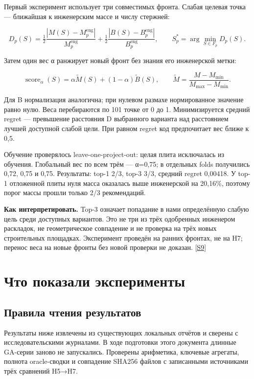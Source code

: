 \documentclass[11pt,a4paper]{article}
\begin{document}
Первый эксперимент использует три совместимых фронта. Слабая целевая точка — ближайшая к инженерским массе и числу стержней:


\[
D_p(S)=\tfrac12\frac{|M(S)-M_p^{\mathrm{eng}}|}{M_p^{\mathrm{eng}}}
+\tfrac12\frac{|B(S)-B_p^{\mathrm{eng}}|}{B_p^{\mathrm{eng}}},
\qquad S_p^*=\arg\min_{S\in F_p}D_p(S).
\]

Затем один вес α ранжирует новый фронт без знания его инженерской метки:


\[
\operatorname{score}_\alpha(S)=\alpha\widetilde M(S)+(1-\alpha)\widetilde B(S),
\qquad \widetilde M=\frac{M-M_{\min}}{M_{\max}-M_{\min}}.
\]

Для B нормализация аналогична; при нулевом размахе нормированное значение равно нулю. Веса перебираются по 101 точке от 0 до 1. Минимизируется средний regret — превышение расстояния D выбранного варианта над расстоянием лучшей доступной слабой цели. При равном regret код предпочитает вес ближе к 0,5.


Обучение проверялось leave-one-project-out: целая плита исключалась из обучения. Глобальный вес по всем трём — α=0,75; в отдельных folds получились 0,72, 0,75 и 0,75. Результаты: top-1 2/3, top-3 3/3, средний regret 0,00418. У top-1 отложенной плиты нуля масса оказалась выше инженерской на 20,16\%, поэтому порог массы прошли только 2/3 рекомендаций.


\textbf{Как интерпретировать.} Top-3 означает попадание в нами определённую слабую цель среди доступных вариантов. Это не три из трёх одобренных инженером раскладок, не геометрическое совпадение и не проверка на трёх новых строительных площадках. Эксперимент проведён на ранних фронтах, не на H7; перенос веса на новые фронты без новой проверки не доказан. {\color{Teal}\small[\hyperlink{S9}{S9}]}


\section{Что показали эксперименты}

\subsection{Правила чтения результатов}

Результаты ниже извлечены из существующих локальных отчётов и сверены с исследовательскими журналами. В ходе подготовки этого документа длинные GA-серии заново не запускались. Проверены арифметика, ключевые агрегаты, полнота oracle-сводки и совпадение SHA256 файлов с записанными источниками трёх сравнений H5→H7.
\end{document}
